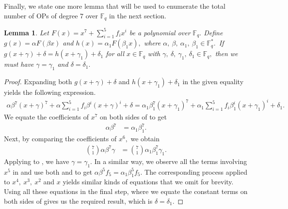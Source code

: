 \documentclass[12pt,a4wide, reqno]{amsart}
\newtheorem{lemma}{Lemma}
\theoremstyle{definition}
\theoremstyle{remark}
\numberwithin{equation}{section}
\begin{document}
Finally, we state one more lemma that will be used to enumerate the total number of OPs of degree $7$ over $\mathbb{F}_q$ in the next section.
\begin{lemma}\label{l6}
    Let $F(x)= x^7+\sum_{i=1}^{5}f_ix^i$ be a polynomial over $\mathbb{F}_q.$ Define $g(x)=\alpha F(\beta x)$ and $h(x)=\alpha_1 F(\beta_1 x),$ where $\alpha,~\beta,~\alpha_1,~\beta_1 \in \mathbb{F}_q^*.$~If $g( x+\gamma)+\delta= h(x+\gamma_1)+\delta_1$ for all $x\in \mathbb{F}_q$ with $\gamma,~\delta,~\gamma_1,~\delta_1 \in \mathbb{F}_q,$ then we must have $\gamma=\gamma_1$ and $\delta=\delta_1.$ 
\end{lemma}
\begin{proof}
Expanding both $g( x+\gamma)+\delta$ and $h(x+\gamma_1)+\delta_1$ in the given equality yields the following expression.
\begin{equation}\label{eq}
    \begin{aligned}
        \alpha \beta ^7(x+\gamma)^7+\alpha \sum_{i=1}^{5}f_i\beta ^i(x+\gamma)^i+\delta=\alpha_1 \beta_1 ^7(x+\gamma_1)^7+\alpha_1 \sum_{i=1}^{5}f_i\beta_1 ^i(x+\gamma_1)^i+\delta_1.
    \end{aligned}
\end{equation}
We equate the coefficients of $x^7$ on both sides of  to get
\begin{equation}\label{eq2}
\begin{aligned}
\alpha \beta ^7&=\alpha_1 \beta_1 ^7.
\end{aligned}
    \end{equation}
   Next, by comparing the coefficients of $x^6,$ we obtain
   \begin{equation}\label{eq3}
\begin{aligned}
\binom{7}{1}\alpha \beta ^7 \gamma&=\binom{7}{1}\alpha_1 \beta_1 ^7 \gamma_1.
\end{aligned}
    \end{equation}
    Applying  to , we have $\gamma=\gamma_1.$ In a similar way, we observe all the terms involving $x^5$ in  and use both  and  to get $\alpha \beta ^5 f_5=\alpha_1 \beta_1 ^5 f_5.$ The corresponding process applied to $x^4,~x^3,~x^2$ and $x$ yields similar kinds of equations that we omit for brevity. Using all these equations in the final step, where we equate the constant terms on both sides of  gives us the required result, which is $\delta=\delta_1.$
\end{proof}
\end{document}
